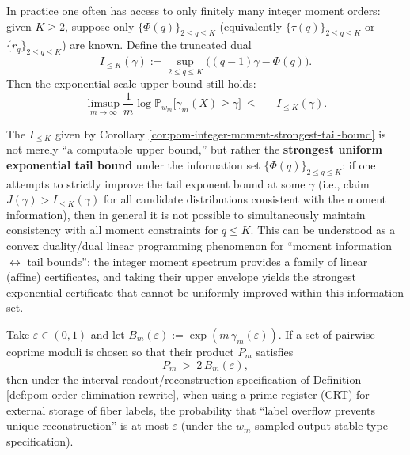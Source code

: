 \begin{corollary}\label{cor:pom-integer-moment-strongest-tail-bound}\label{cor:pom-best-computable-tail-bound-integer-moments}
In practice one often has access to only finitely many integer moment orders: given \(K\ge 2\), suppose only \(\{\Phi(q)\}_{2\le q\le K}\) (equivalently \(\{\tau(q)\}_{2\le q\le K}\) or \(\{r_q\}_{2\le q\le K}\)) are known.
Define the truncated dual
\[
I_{\le K}(\gamma):=\sup_{2\le q\le K}\bigl((q-1)\gamma-\Phi(q)\bigr).
\]
Then the exponential-scale upper bound still holds:
\[
\limsup_{m\to\infty}\frac{1}{m}\log \mathbb{P}_{w_m}\big[\gamma_m(X)\ge \gamma\big]
\ \le\ -\,I_{\le K}(\gamma).
\]
\end{corollary}

\begin{remark}\label{rem:pom-integer-moment-tail-optimality}
The \(I_{\le K}\) given by Corollary \ref{cor:pom-integer-moment-strongest-tail-bound} is not merely ``a computable upper bound,'' but rather the \textbf{strongest uniform exponential tail bound} under the information set \(\{\Phi(q)\}_{2\le q\le K}\):
if one attempts to strictly improve the tail exponent bound at some \(\gamma\) (i.e., claim \(J(\gamma)>I_{\le K}(\gamma)\) for all candidate distributions consistent with the moment information), then in general it is not possible to simultaneously maintain consistency with all moment constraints for \(q\le K\).
This can be understood as a convex duality/dual linear programming phenomenon for ``moment information \(\leftrightarrow\) tail bounds'': the integer moment spectrum provides a family of linear (affine) certificates, and taking their upper envelope yields the strongest exponential certificate that cannot be uniformly improved within this information set.
\end{remark}

\begin{corollary}\label{cor:pom-prime-register-quantile-budget}
Take \(\varepsilon\in(0,1)\) and let \(B_m(\varepsilon):=\exp(m\,\gamma_m(\varepsilon))\).
If a set of pairwise coprime moduli is chosen so that their product \(P_m\) satisfies
$$
P_m\ >\ 2\,B_m(\varepsilon),
$$
then under the interval readout/reconstruction specification of Definition \ref{def:pom-order-elimination-rewrite}, when using a prime-register (CRT) for external storage of fiber labels, the probability that ``label overflow prevents unique reconstruction'' is at most \(\varepsilon\) (under the \(w_m\)-sampled output stable type specification).
\end{corollary}


